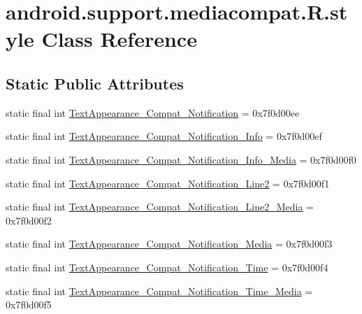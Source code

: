 \hypertarget{classandroid_1_1support_1_1mediacompat_1_1_r_1_1style}{}\section{android.\+support.\+mediacompat.\+R.\+style Class Reference}
\label{classandroid_1_1support_1_1mediacompat_1_1_r_1_1style}
\subsection*{Static Public Attributes}
\begin{DoxyCompactItemize}
\item 
static final int \mbox{\hyperlink{classandroid_1_1support_1_1mediacompat_1_1_r_1_1style_a5be05765d7d9f2554774adfeb58216db}{Text\+Appearance\+\_\+\+Compat\+\_\+\+Notification}} = 0x7f0d00ee
\item 
static final int \mbox{\hyperlink{classandroid_1_1support_1_1mediacompat_1_1_r_1_1style_a64f71dddd320a8c3eed78e2455e727b8}{Text\+Appearance\+\_\+\+Compat\+\_\+\+Notification\+\_\+\+Info}} = 0x7f0d00ef
\item 
static final int \mbox{\hyperlink{classandroid_1_1support_1_1mediacompat_1_1_r_1_1style_a01fa01e023d645ce6ce441565683e22e}{Text\+Appearance\+\_\+\+Compat\+\_\+\+Notification\+\_\+\+Info\+\_\+\+Media}} = 0x7f0d00f0
\item 
static final int \mbox{\hyperlink{classandroid_1_1support_1_1mediacompat_1_1_r_1_1style_afc492ecce64a2462ef25d9433aa9b65f}{Text\+Appearance\+\_\+\+Compat\+\_\+\+Notification\+\_\+\+Line2}} = 0x7f0d00f1
\item 
static final int \mbox{\hyperlink{classandroid_1_1support_1_1mediacompat_1_1_r_1_1style_af2ebb03f4c31f395fa903ba7773c208f}{Text\+Appearance\+\_\+\+Compat\+\_\+\+Notification\+\_\+\+Line2\+\_\+\+Media}} = 0x7f0d00f2
\item 
static final int \mbox{\hyperlink{classandroid_1_1support_1_1mediacompat_1_1_r_1_1style_a41001c01d7dba9cd87333d9a10407232}{Text\+Appearance\+\_\+\+Compat\+\_\+\+Notification\+\_\+\+Media}} = 0x7f0d00f3
\item 
static final int \mbox{\hyperlink{classandroid_1_1support_1_1mediacompat_1_1_r_1_1style_a0fede7691a6e18add5bb4d4b98de1a6f}{Text\+Appearance\+\_\+\+Compat\+\_\+\+Notification\+\_\+\+Time}} = 0x7f0d00f4
\item 
static final int \mbox{\hyperlink{classandroid_1_1support_1_1mediacompat_1_1_r_1_1style_a1aad10786f6f7ff9172d24537dd7fe41}{Text\+Appearance\+\_\+\+Compat\+\_\+\+Notification\+\_\+\+Time\+\_\+\+Media}} = 0x7f0d00f5

\end{DoxyCompactItemize}
